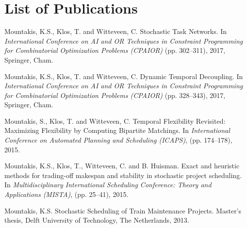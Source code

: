 \chapter*{List of Publications}
\label{publications}

\begin{etaremune}{\small

\item {\textrm{Mountakis, K.S.}, Klos, T. and Witteveen, C. Stochastic Task Networks. In \emph{International Conference on AI and OR Techniques in Constraint Programming for Combinatorial Optimization Problems (CPAIOR)} (pp. 302--311), 2017, Springer, Cham.}

\item {\textrm{Mountakis, K.S.}, Klos, T. and Witteveen, C. Dynamic Temporal Decoupling. In \emph{International Conference on AI and OR Techniques in Constraint Programming for Combinatorial Optimization Problems (CPAIOR)} (pp. 328--343), 2017, Springer, Cham.}

\item {\textrm{Mountakis, S.}, Klos, T. and Witteveen, C. Temporal Flexibility Revisited: Maximizing Flexibility by Computing Bipartite Matchings. In \emph{International Conference on Automated Planning and Scheduling (ICAPS)}, (pp. 174--178), 2015.}

\item {\textrm{Mountakis, K.S.}, Klos, T., Witteveen, C. and B. Huisman. Exact and heuristic methods for trading-off makespan and stability in stochastic project scheduling. 
	In \emph{Multidisciplinary International Scheduling Conference: Theory and Applications (MISTA)}, (pp. 25--41), 2015.}

\item {\textrm{Mountakis, K.S.} Stochastic Scheduling of Train Maintenance Projects. Master's thesis, Delft University of Technology, The Netherlands, 2013.}

}\end{etaremune}

